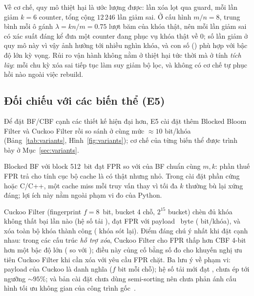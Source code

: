 \documentclass[11pt,a4paper]{article}
\begin{document}
Về cơ chế, quy mô thiệt hại là ước lượng được: \FnPerformed{} lần xóa lọt
qua guard, mỗi lần giảm $k=6$ counter, tổng cộng $12\,246$ lần giảm sai.
Ở cấu hình $m/n=8$, trung bình mỗi ô gánh $\lambda=kn/m=0.75$ lượt băm của
khóa thật, nên mỗi lần giảm sai có xác suất đáng kể đưa một counter đang
phục vụ khóa thật về 0; số lần giảm ở quy mô này vì vậy ảnh hưởng tới nhiều
nghìn khóa, và con số \FnCount{} (\FnRate{}) phù hợp với bậc độ lớn kỳ
vọng. Rủi ro vận hành không nằm ở thiệt hại tức thời mà ở tính
\emph{tích lũy}: mỗi chu kỳ xóa sai tiếp tục làm suy giảm bộ lọc, và không
có cơ chế tự phục hồi nào ngoài việc rebuild.

\begin{table}[H]\centering
\caption{E4: Xóa đúng và stress test xóa sai trong CBF}
\label{tab:falseneg}
\small

\end{table}

\subsection{Đối chiếu với các biến thể (E5)}
\label{sec:e5result}
Để đặt BF/CBF cạnh các thiết kế hiện đại hơn, E5 cài đặt thêm Blocked Bloom
Filter và Cuckoo Filter rồi so sánh ở cùng mức ${\approx}10$ bit/khóa
(Bảng~\ref{tab:variants}, Hình~\ref{fig:variants}); cơ chế của từng biến
thể được trình bày ở Mục~\ref{sec:variants}.

Blocked BF với block 512~bit đạt FPR \BlkFprTen{} so với \FprEmpTen{} của
BF chuẩn cùng $m,k$: phần thuế FPR trả cho tính cục bộ cache là có thật
nhưng nhỏ. Trong cài đặt phần cứng hoặc C/C++, một cache miss mỗi truy vấn
thay vì tối đa $k$ thường bù lại xứng đáng; lợi ích này nằm ngoài phạm vi
đo của Python.

Cuckoo Filter (fingerprint $f=8$~bit, bucket 4 chỗ, $2^{15}$ bucket) chèn
đủ \NKeys{} khóa không thất bại lần nào (hệ số tải \CkLoad{}), đạt FPR
\CkFpr{} với payload \CkMem{}~byte (\CkBitsPerKey{} bit/khóa), và xóa toàn
bộ khóa thành công (\CkLeftover{} khóa sót lại). Điểm đáng chú ý nhất khi
đặt cạnh nhau: trong các cấu trúc \emph{hỗ trợ xóa}, Cuckoo Filter cho FPR
thấp hơn CBF 4-bit hơn một bậc độ lớn (\CkFpr{} so với \EqFprCBFFour{});
điều này củng cố bằng số đo cho khuyến nghị ưu tiên Cuckoo Filter khi cần
xóa với yêu cầu FPR chặt. Ba lưu ý về phạm vi: payload của Cuckoo là danh nghĩa
($f$ bit mỗi chỗ); hệ số tải mới đạt \CkLoad{}, chưa ép tới ngưỡng
${\sim}95\%$; và bản cài đặt chưa dùng semi-sorting nên chưa phản ánh cấu
hình tối ưu không gian của công trình gốc~\cite{cuckoo2014}.
\end{document}
